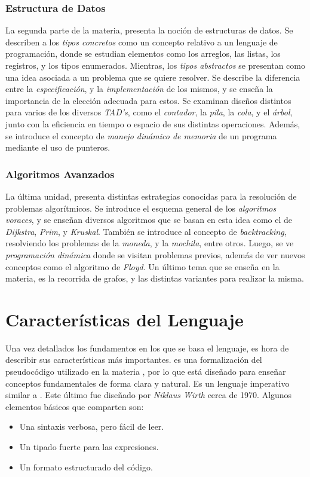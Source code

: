 \subsubsection{Estructura de Datos}

La segunda parte de la materia, presenta la noción de estructuras de datos.
Se describen a los \textit{tipos concretos} como un concepto relativo a un lenguaje de programación, donde se estudian elementos como los arreglos, las listas, los registros, y los tipos enumerados.
Mientras, los \textit{tipos abstractos} se presentan como una idea asociada a un problema que se quiere resolver.
Se describe la diferencia entre la \textit{especificación}, y la \textit{implementación} de los mismos, y se enseña la importancia de la elección adecuada para estos.
Se examinan diseños distintos para varios de los diversos \textit{TAD's}, como el \textit{contador}, la \textit{pila}, la \textit{cola}, y el \textit{árbol}, junto con la eficiencia en tiempo o espacio de sus distintas operaciones.
Además, se introduce el concepto de \textit{manejo dinámico de memoria} de un programa mediante el uso de punteros.

\subsubsection{Algoritmos Avanzados}

La última unidad, presenta distintas estrategias conocidas para la resolución de problemas algorítmicos.
Se introduce el esquema general de los \textit{algoritmos voraces}, y se enseñan diversos algoritmos que se basan en esta idea como el de \textit{Dijkstra}, \textit{Prim}, y \textit{Kruskal}.
También se introduce al concepto de \textit{backtracking}, resolviendo los problemas de la \textit{moneda}, y la \textit{mochila}, entre otros.
Luego, se ve \textit{programación dinámica} donde se visitan problemas previos, además de ver nuevos conceptos como el algoritmo de \textit{Floyd}.
Un último tema que se enseña en la materia, es la recorrida de grafos, y las distintas variantes para realizar la misma.

\section{Características del Lenguaje}

Una vez detallados los fundamentos en los que se basa el lenguaje, es hora de describir sus características más importantes.
\Lenguaje{} es una formalización del pseudocódigo utilizado en la materia \Materia{}, por lo que está diseñado para enseñar conceptos fundamentales de forma clara y natural.
Es un lenguaje imperativo similar a \Pascal{}.
Este último fue diseñado por \textit{Niklaus Wirth} cerca de 1970.
Algunos elementos básicos que comparten son:
\begin{itemize}
    \item Una sintaxis verbosa, pero fácil de leer.
    \item Un tipado fuerte para las expresiones.
    \item Un formato estructurado del código.
\end{itemize}


